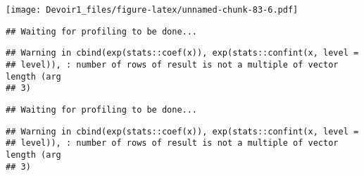 \documentclass[]{article}
\newenvironment{Shaded}{\begin{snugshade}}{\end{snugshade}}
\newcommand{\KeywordTok}[1]{\textcolor[rgb]{0.13,0.29,0.53}{\textbf{#1}}}
\newcommand{\DataTypeTok}[1]{\textcolor[rgb]{0.13,0.29,0.53}{#1}}
\newcommand{\DecValTok}[1]{\textcolor[rgb]{0.00,0.00,0.81}{#1}}
\newcommand{\StringTok}[1]{\textcolor[rgb]{0.31,0.60,0.02}{#1}}
\newcommand{\OperatorTok}[1]{\textcolor[rgb]{0.81,0.36,0.00}{\textbf{#1}}}
\newcommand{\NormalTok}[1]{#1}
\begin{document}
\texttt{[image: Devoir1\_files/figure-latex/unnamed-chunk-83-6.pdf]}

\begin{Shaded}
\end{Shaded}

\begin{verbatim}
## Waiting for profiling to be done...
\end{verbatim}

\begin{verbatim}
## Warning in cbind(exp(stats::coef(x)), exp(stats::confint(x, level =
## level)), : number of rows of result is not a multiple of vector length (arg
## 3)
\end{verbatim}

\begin{verbatim}
## Waiting for profiling to be done...
\end{verbatim}

\begin{verbatim}
## Warning in cbind(exp(stats::coef(x)), exp(stats::confint(x, level =
## level)), : number of rows of result is not a multiple of vector length (arg
## 3)
\end{verbatim}
\end{document}
